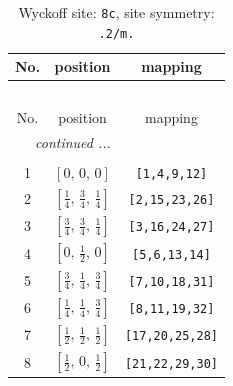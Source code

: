 \documentclass[fleqn,8pt]{jsarticle}
\begin{document}
\renewcommand{\arraystretch}{1.2}
\begin{longtable}{ccc}
\caption{Wyckoff site: {\tt 8c}, site symmetry: {\tt .2/m.}}
 \\
 \hline \hline
No. & position & mapping \\ \hline \endfirsthead

\multicolumn{2}{l}{\tablename\ \thetable{}} \\
 \hline \hline
No. & position & mapping \\ \hline \endhead

 \hline \hline
\multicolumn{2}{r}{\footnotesize\it continued ...} \\ \endfoot

 \hline \hline
\multicolumn{2}{r}{} \\ \endlastfoot

1 & $\left[ 0,\, 0,\, 0 \right]$ & {\tt [1,4,9,12]} \\ \hline
2 & $\left[ \frac{1}{4},\, \frac{3}{4},\, \frac{1}{4} \right]$ & {\tt [2,15,23,26]} \\ \hline
3 & $\left[ \frac{3}{4},\, \frac{3}{4},\, \frac{1}{4} \right]$ & {\tt [3,16,24,27]} \\ \hline
4 & $\left[ 0,\, \frac{1}{2},\, 0 \right]$ & {\tt [5,6,13,14]} \\ \hline
5 & $\left[ \frac{3}{4},\, \frac{1}{4},\, \frac{3}{4} \right]$ & {\tt [7,10,18,31]} \\ \hline
6 & $\left[ \frac{1}{4},\, \frac{1}{4},\, \frac{3}{4} \right]$ & {\tt [8,11,19,32]} \\ \hline
7 & $\left[ \frac{1}{2},\, \frac{1}{2},\, \frac{1}{2} \right]$ & {\tt [17,20,25,28]} \\ \hline
8 & $\left[ \frac{1}{2},\, 0,\, \frac{1}{2} \right]$ & {\tt [21,22,29,30]} \\
\end{longtable}
\renewcommand{\arraystretch}{1.2}
\end{document}
